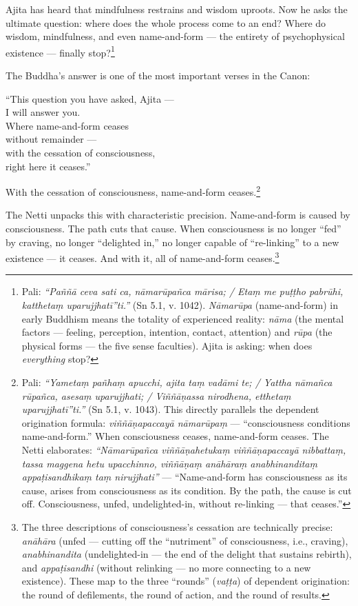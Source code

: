 Ajita has heard that mindfulness restrains and wisdom uproots. Now he asks the ultimate question: where does the whole process come to an end? Where do wisdom, mindfulness, and even name-and-form --- the entirety of psychophysical existence --- finally stop?\footnote{Pali: \textit{``Paññā ceva sati ca, nāmarūpañca mārisa; / Etaṃ me puṭṭho pabrūhi, katthetaṃ uparujjhatī''ti.''} (Sn 5.1, v. 1042). \textit{Nāmarūpa} (name-and-form) in early Buddhism means the totality of experienced reality: \textit{nāma} (the mental factors --- feeling, perception, intention, contact, attention) and \textit{rūpa} (the physical forms --- the five sense faculties). Ajita is asking: when does \textit{everything} stop?}

The Buddha's answer is one of the most important verses in the Canon:

\begin{versebox}
``This question you have asked, Ajita ---\\
I will answer you.\\
Where name-and-form ceases\\
without remainder ---\\
with the cessation of consciousness,\\
right here it ceases.''
\end{versebox}

With the cessation of consciousness, name-and-form ceases.\footnote{Pali: \textit{``Yametaṃ pañhaṃ apucchi, ajita taṃ vadāmi te; / Yattha nāmañca rūpañca, asesaṃ uparujjhati; / Viññāṇassa nirodhena, etthetaṃ uparujjhatī''ti.''} (Sn 5.1, v. 1043). This directly parallels the dependent origination formula: \textit{viññāṇapaccayā nāmarūpaṃ} --- ``consciousness conditions name-and-form.'' When consciousness ceases, name-and-form ceases. The Netti elaborates: \textit{``Nāmarūpañca viññāṇahetukaṃ viññāṇapaccayā nibbattaṃ, tassa maggena hetu upacchinno, viññāṇaṃ anāhāraṃ anabhinanditaṃ appaṭisandhikaṃ taṃ nirujjhati''} --- ``Name-and-form has consciousness as its cause, arises from consciousness as its condition. By the path, the cause is cut off. Consciousness, unfed, undelighted-in, without re-linking --- that ceases.''}

The Netti unpacks this with characteristic precision. Name-and-form is caused by consciousness. The path cuts that cause. When consciousness is no longer ``fed'' by craving, no longer ``delighted in,'' no longer capable of ``re-linking'' to a new existence --- it ceases. And with it, all of name-and-form ceases.\footnote{The three descriptions of consciousness's cessation are technically precise: \textit{anāhāra} (unfed --- cutting off the ``nutriment'' of consciousness, i.e., craving), \textit{anabhinandita} (undelighted-in --- the end of the delight that sustains rebirth), and \textit{appaṭisandhi} (without relinking --- no more connecting to a new existence). These map to the three ``rounds'' (\textit{vaṭṭa}) of dependent origination: the round of defilements, the round of action, and the round of results.}

